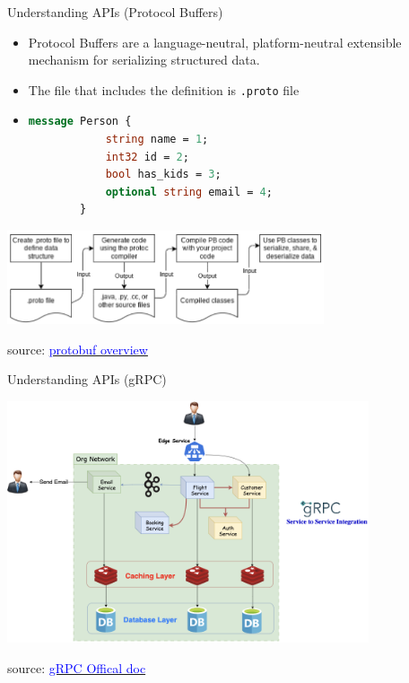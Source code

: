 \documentclass{beamer}
\newcommand{\code}[1]{\colorbox{codegray}{\texttt{#1}}}
\begin{document}
\begin{frame}[fragile,t]{Understanding APIs \small (Protocol Buffers)}  
	
	\begin{itemize}
	\scriptsize
      \item Protocol Buffers are a language-neutral, platform-neutral extensible mechanism for serializing structured data.
      \item The file that includes the definition is \code {.proto} file
      
      \item[] 
      \scriptsize
      \begin{lstlisting}[language=protobuf]
		message Person {
			string name = 1;
			int32 id = 2;
			bool has_kids = 3;
			optional string email = 4;
		}
      \end{lstlisting}
    \end{itemize}
    
    \begin{center}
      \includegraphics[width=0.7\textwidth, height=0.3\textheight]{img/protobuf-img.png}
    \end{center}
    
    \tiny { source: \href{https://protobuf.dev/overview/}{\textcolor{blue}{protobuf overview}}}
  
\end{frame}

\begin{frame}[fragile,t]{Understanding APIs \small (gRPC)}  

    \begin{center}
      \includegraphics[width=0.8\textwidth, height=0.7\textheight]{img/flight-gRPC.png}
    \end{center}
    \tiny { source: \href{https://grpc.io/docs/what-is-grpc/introduction/}{\textcolor{blue}{gRPC Offical doc}}}
  
\end{frame}
\end{document}
